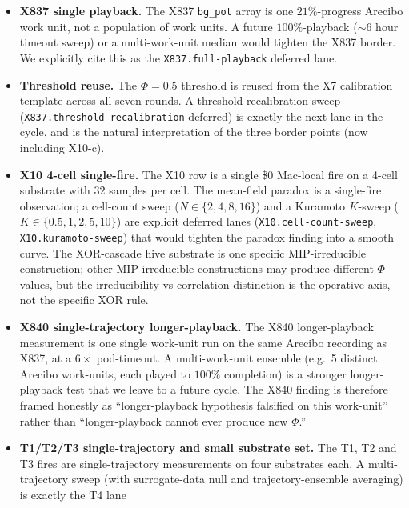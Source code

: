 \documentclass[11pt,a4paper]{article}
\begin{document}
\begin{itemize}
    do not claim type-axis universality outside the calibrated corner;
    we claim only that within the calibrated corner the type axis
    matches the ground-truth.
  \item \textbf{X837 single playback.} The X837 \texttt{bg\_pot} array
    is one $21\%$-progress Arecibo work unit, not a population of
    work units. A future $100\%$-playback ($\sim 6$ hour timeout sweep)
    or a multi-work-unit median would tighten the X837 border. We
    explicitly cite this as the \texttt{X837.full-playback} deferred
    lane.
  \item \textbf{Threshold reuse.} The $\Phi = 0.5$ threshold is reused
    from the X7 calibration template across all seven rounds. A
    threshold-recalibration sweep (\texttt{X837.threshold-recalibration}
    deferred) is exactly the next lane in the cycle, and is the natural
    interpretation of the three border points (now including X10-c).
  \item \textbf{X10 4-cell single-fire.} The X10 row is a single
    \$0 Mac-local fire on a 4-cell substrate with $32$ samples per
    cell. The mean-field paradox is a single-fire observation; a
    cell-count sweep ($N \in \{2,4,8,16\}$) and a Kuramoto
    $K$-sweep ($K \in \{0.5, 1, 2, 5, 10\}$) are explicit deferred
    lanes (\texttt{X10.cell-count-sweep},
    \texttt{X10.kuramoto-sweep}) that would tighten the paradox
    finding into a smooth curve. The XOR-cascade hive substrate is
    one specific MIP-irreducible construction; other MIP-irreducible
    constructions may produce different $\Phi$ values, but the
    irreducibility-vs-correlation distinction is the operative axis,
    not the specific XOR rule.
  \item \textbf{X840 single-trajectory longer-playback.} The X840
    longer-playback measurement is one single work-unit run on the
    same Arecibo recording as X837, at a $6\times$ pod-timeout. A
    multi-work-unit ensemble (e.g.\ 5 distinct Arecibo work-units,
    each played to $100\%$ completion) is a stronger longer-playback
    test that we leave to a future cycle. The X840 finding is
    therefore framed honestly as ``longer-playback hypothesis
    falsified on this work-unit'' rather than ``longer-playback
    cannot ever produce new $\Phi$.''
  \item \textbf{T1/T2/T3 single-trajectory and small substrate set.}
    The T1, T2 and T3 fires are single-trajectory measurements on four
    substrates each. A multi-trajectory sweep (with surrogate-data
    null and trajectory-ensemble averaging) is exactly the T4 lane

\end{itemize}
\end{document}
